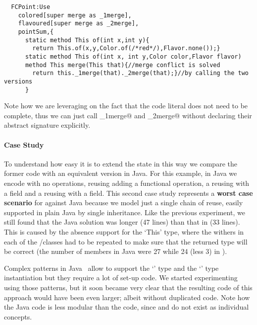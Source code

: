 \saveSpace\begin{lstlisting}
  FCPoint:Use
    colored[super merge as _1merge],
    flavoured[super merge as _2merge],
    pointSum,{
      static method This of(int x,int y){
        return This.of(x,y,Color.of(/*red*/),Flavor.none());}
      static method This of(int x, int y,Color color,Flavor flavor)
      method This merge(This that){//merge conflict is solved 
        return this._1merge(that)._2merge(that);}//by calling the two versions
      }
\end{lstlisting}  \saveSpace\saveSpace

Note how we are leveraging on the fact that the code literal
 does not need to be complete, 
thus we can just call \Q@_1merge@ and \Q@_2merge@ without
 declaring their abstract signature explicitly.



\paragraph{Case Study}
To understand how easy it is to extend the state in this
way we compare the former code with an equivalent version in
Java.
For this example, in Java we encode \Q@Point@ with no operations,
\Q@PointSum@ reusing \Q@Point@ adding a functional \Q@sum@ operation,
a \Q@CPoint@ reusing \Q@PointSum@ with a \Q@Color@ field
and a \Q@FCPoint@ reusing \Q@CPoint@ with a \Q@Flavour@ field.
This second case study represents a \textbf{worst case scenario} for \name against Java because we model just a single chain of reuse,
easily supported in plain Java by single inheritance.
Like the previous experiment, we still found that the Java solution was longer (47 lines) than that in \name (33 lines). This is caused by the absence support for the `This' type, where the withers in each of the \Q@CPoint@/\Q@FCpoint@ classes had to be repeated to make sure that the returned type will be correct (the number of members in Java were 27 while 24 (less 3) in \name).

Complex patterns in Java~\cite{} allow to support the `\Q@This@' type and the `\Q@This@' type instantiation but they require a lot of set-up code. We started experimenting using those patterns, but it soon became very clear that the resulting code of this approach would have been even larger; albeit without duplicated code.
Note how the Java code is less modular than the \name code, since \Q@Colored@ and \Q@Flavoured@ do not exist
as individual concepts.

